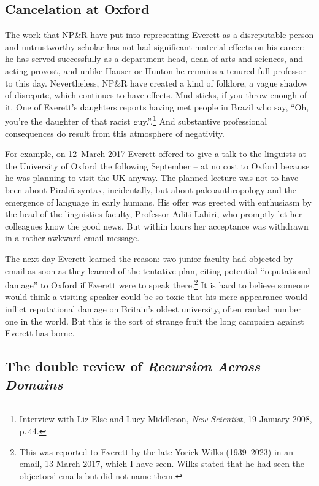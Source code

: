 \documentclass[output=paper,colorlinks,citecolor=brown
]{langscibook}
\begin{document}
\subsection{Cancelation at Oxford}
\label{sec-Oxford-cancelation}

The work that NP\&R have put into representing Everett as a
disreputable person and untrustworthy scholar has not had significant
material effects on his career: he has served successfully as a
department head, dean of arts and sciences, and acting provost, and
unlike Hauser or Hunton he remains a tenured full professor to this
day. Nevertheless, NP\&R have created a kind of folklore, a vague
shadow of disrepute, which continues to have effects. Mud sticks, if
you throw enough of it. One of Everett's daughters reports having met
people in Brazil who say, ``Oh, you're the daughter of that racist
guy.''.\footnote{\label{newscientist}
   Interview with Liz Else and Lucy Middleton, \textit{New Scientist},
   19 January 2008, p.\,44.}
And substantive professional consequences do result from this atmosphere
of negativity.

For example, on 12~March 2017 Everett offered to give a talk to the
linguists at the University of Oxford the following September -- at
no cost to Oxford because he was planning to visit the UK anyway. The
planned lecture was not to have been about Pirah{\~a} syntax,
incidentally, but about paleoanthropology and the emergence of language
in early humans. His offer was greeted with enthusiasm by the head
of the linguistics faculty, Professor Aditi Lahiri, who promptly let
her colleagues know the good news. But within hours her acceptance
was withdrawn in a rather awkward email message.

The next day Everett learned the reason: two junior faculty had
objected by email as soon as they learned of the tentative plan,
citing potential ``reputational damage'' to Oxford if Everett were
to speak there.\footnote{\label{yorick}
   This was reported to Everett by the late Yorick Wilks (1939--2023)
   in an email, 13 March 2017, which I have seen. Wilks stated that
   he had seen the objectors' emails but did not name them.}
It is hard to believe someone would think a visiting speaker could
be so toxic that his mere appearance would inflict reputational
damage on Britain's oldest university, often ranked number one in
the world. But this is the sort of strange fruit the long campaign
against Everett has borne.

\subsection{The double review of \textit{Recursion Across Domains}}
\end{document}
